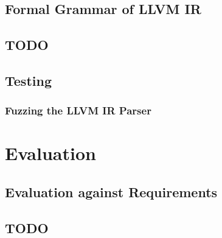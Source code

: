 \documentclass[12pt, a4paper]{article}
\begin{document}

\subsection{Formal Grammar of LLVM IR}


\subsection{TODO}


\subsection{Testing}


\subsubsection{Fuzzing the LLVM IR Parser}



\section{Evaluation}


\subsection{Evaluation against Requirements}


\subsection{TODO}
\end{document}

